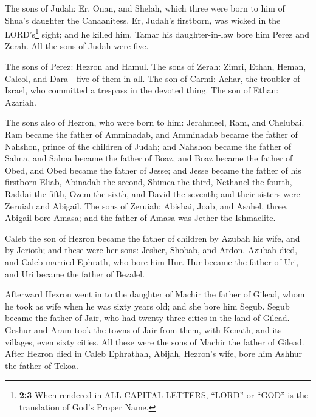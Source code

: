  The sons of Judah: Er, Onan, and Shelah, which three were
born to him of Shua's daughter the Canaanitess. Er, Judah's firstborn,
was wicked in the LORD's\footnote{\textbf{2:3} When rendered in ALL
  CAPITAL LETTERS, ``LORD'' or ``GOD'' is the translation of God's
  Proper Name.} sight; and he killed him.  Tamar his
daughter-in-law bore him Perez and Zerah. All the sons of Judah were
five.

 The sons of Perez: Hezron and Hamul.  The
sons of Zerah: Zimri, Ethan, Heman, Calcol, and Dara---five of them in
all.  The son of Carmi: Achar, the troubler of Israel, who
committed a trespass in the devoted thing.  The son of
Ethan: Azariah.

 The sons also of Hezron, who were born to him: Jerahmeel,
Ram, and Chelubai.  Ram became the father of Amminadab,
and Amminadab became the father of Nahshon, prince of the children of
Judah;  and Nahshon became the father of Salma, and Salma
became the father of Boaz,  and Boaz became the father of
Obed, and Obed became the father of Jesse;  and Jesse
became the father of his firstborn Eliab, Abinadab the second, Shimea
the third,  Nethanel the fourth, Raddai the fifth,
 Ozem the sixth, and David the seventh; 
and their sisters were Zeruiah and Abigail. The sons of Zeruiah:
Abishai, Joab, and Asahel, three.  Abigail bore Amasa;
and the father of Amasa was Jether the Ishmaelite.

 Caleb the son of Hezron became the father of children by
Azubah his wife, and by Jerioth; and these were her sons: Jesher,
Shobab, and Ardon.  Azubah died, and Caleb married
Ephrath, who bore him Hur.  Hur became the father of Uri,
and Uri became the father of Bezalel.

 Afterward Hezron went in to the daughter of Machir the
father of Gilead, whom he took as wife when he was sixty years old; and
she bore him Segub.  Segub became the father of Jair, who
had twenty-three cities in the land of Gilead.  Geshur
and Aram took the towns of Jair from them, with Kenath, and its
villages, even sixty cities. All these were the sons of Machir the
father of Gilead.  After Hezron died in Caleb Ephrathah,
Abijah, Hezron's wife, bore him Ashhur the father of Tekoa.


